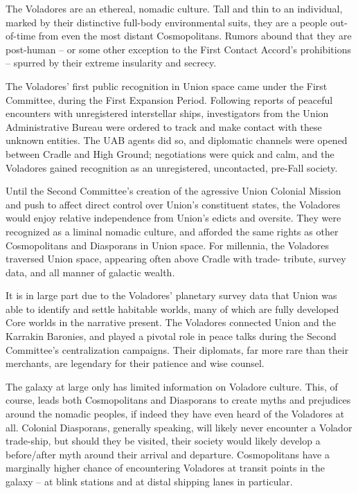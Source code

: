 The Voladores are an ethereal, nomadic culture. Tall and thin to an individual, marked by their
distinctive full-body environmental suits, they are a people out-of-time from even the most
distant Cosmopolitans. Rumors abound that they are post-human -- or some other exception to
the First Contact Accord’s prohibitions -- spurred by their extreme insularity and secrecy.

The Voladores’ first public recognition in Union space came under the First Committee, during
the First Expansion Period. Following reports of peaceful encounters with unregistered
interstellar ships, investigators from the Union Administrative Bureau were ordered to track and
make contact with these unknown entities. The UAB agents did so, and diplomatic channels
were opened between Cradle and High Ground; negotiations were quick and calm, and the
Voladores gained recognition as an unregistered, uncontacted, pre-Fall society.

Until the Second Committee’s creation of the agressive Union Colonial Mission and push to
affect direct control over Union’s constituent states, the Voladores would enjoy relative
independence from Union’s edicts and oversite. They were recognized as a liminal nomadic
culture, and afforded the same rights as other Cosmopolitans and Diasporans in Union space.
For millennia, the Voladores traversed Union space, appearing often above Cradle with trade-
tribute, survey data, and all manner of galactic wealth.

It is in large part due to the Voladores’ planetary survey data that Union was able to identify and
settle habitable worlds, many of which are fully developed Core worlds in the narrative present.
The Voladores connected Union and the Karrakin Baronies, and played a pivotal role in peace
talks during the Second Committee’s centralization campaigns. Their diplomats, far more rare
than their merchants, are legendary for their patience and wise counsel.

The galaxy at large only has limited information on Voladore culture. This, of course, leads both
Cosmopolitans and Diasporans to create myths and prejudices around the nomadic peoples, if
indeed they have even heard of the Voladores at all. Colonial Diasporans, generally speaking, will
likely never encounter a Volador trade-ship, but should they be visited, their society would likely
develop a before/after myth around their arrival and departure. Cosmopolitans have a marginally
higher chance of encountering Voladores at transit points in the galaxy -- at blink stations and at
distal shipping lanes in particular.

